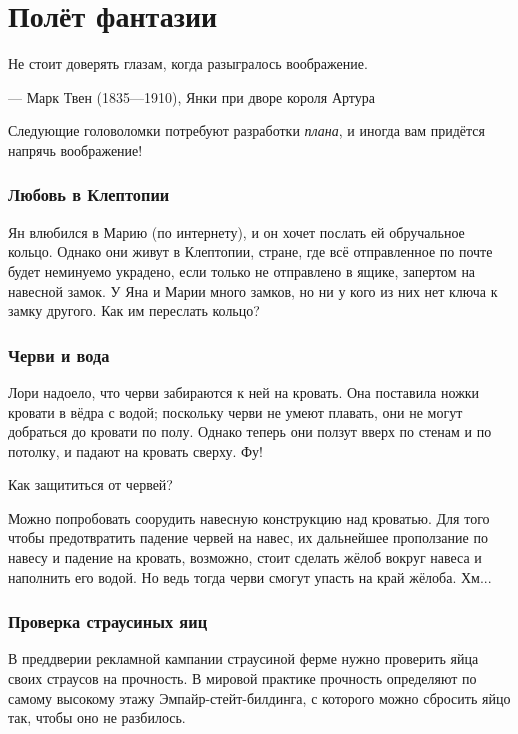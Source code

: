 \chapter{Полёт фантазии}


\setlength{\epigraphwidth}{.80\textwidth}
\epigraph{Не стоит доверять глазам, когда разыгралось воображение.
}{--- Марк Твен (1835---1910), Янки при дворе короля Артура}

Следующие головоломки потребуют разработки \emph{плана},
и иногда вам придётся напрячь воображение!

\subsection*{Любовь в Клептопии}\label{Любовь в Клептопии}

Ян влюбился в Марию (по интернету), и он хочет послать ей обручальное кольцо.
Однако они живут в Клептопии, стране, где всё отправленное по почте будет неминуемо украдено, если только не отправлено в ящике, запертом на навесной замок.
У Яна и Марии много замков, но ни у кого из них нет ключа к замку другого.
Как им переслать кольцо?

\subsection*{Черви и вода}\label{Черви и вода}

Лори надоело, что черви забираются к ней на кровать.
Она поставила ножки кровати в вёдра с водой;
поскольку черви не умеют плавать, они не могут добраться до кровати по полу.
Однако теперь они ползут вверх по стенам и по потолку, и падают на кровать сверху.
Фу!

Как защититься от червей?

Можно попробовать соорудить навесную конструкцию над кроватью.
Для того чтобы предотвратить падение червей на навес,
их дальнейшее проползание по навесу
и падение на кровать, возможно, стоит сделать жёлоб вокруг навеса и наполнить его водой.
Но ведь тогда черви смогут упасть на край жёлоба.
Хм...

\subsection*{Проверка страусиных яиц}

В преддверии рекламной кампании страусиной ферме нужно проверить яйца своих страусов на прочность.
В мировой практике прочность определяют по самому высокому этажу Эмпайр-стейт-билдинга, с которого можно сбросить яйцо так, чтобы оно не разбилось.

